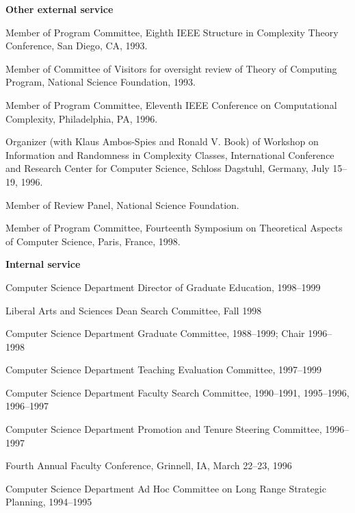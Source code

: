 \vspace*{\bigskipamount}
{\bf Other external service}

\hangindent=0.3in
Member of Program Committee, Eighth IEEE Structure in Complexity Theory
Conference, San Diego, CA, 1993.

\hangindent=0.3in
Member of Committee of Visitors for oversight review of Theory
of Computing Program, National Science Foundation, 1993.

\hangindent=0.3in
Member of Program Committee, Eleventh IEEE Conference on
Computational Complexity, Philadelphia, PA, 1996.

\hangindent=0.3in
Organizer (with Klaus Ambos-Spies and Ronald V. Book) of Workshop
on Information and Randomness in Complexity Classes,
International Conference and Research Center for Computer
Science, Schloss Dagstuhl, Germany, July 15--19, 1996.

\hangindent=0.3in
Member of Review Panel, National Science Foundation.

\hangindent=0.3in
Member of Program Committee, Fourteenth Symposium on 
Theoretical Aspects of Computer Science, Paris,
France, 1998.

\vspace*{\bigskipamount}
{\bf Internal service}

\vspace*{\smallskipamount}
\hangindent=0.3in
Computer Science Department Director of Graduate Education, 1998--1999

\hangindent=0.3in
Liberal Arts and Sciences Dean Search Committee, Fall 1998

\hangindent=0.3in
Computer Science Department Graduate Committee, 1988--1999; Chair 1996--1998

\hangindent=0.3in
Computer Science Department Teaching Evaluation Committee, 1997--1999

\hangindent=0.3in
Computer Science Department Faculty Search Committee, 1990--1991, 1995--1996,
1996--1997

\hangindent=0.3in
Computer Science Department Promotion and Tenure Steering Committee, 1996--1997

\hangindent=0.3in
Fourth Annual Faculty Conference, Grinnell, IA, March 22--23, 1996

\hangindent=0.3in
Computer Science Department Ad Hoc Committee on Long Range Strategic
Planning, 1994--1995

